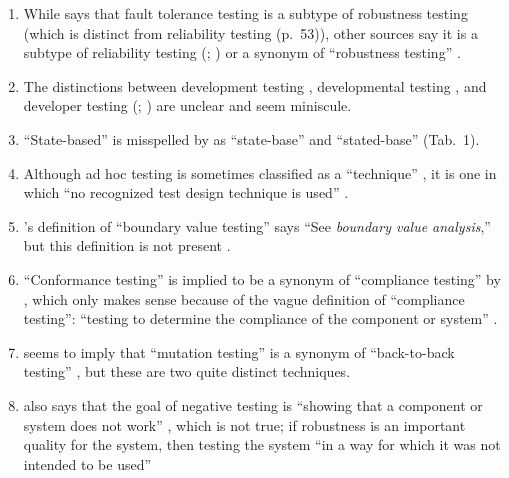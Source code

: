 \begin{enumerate}
      \item While \citeauthor{Firesmith2015} says that fault tolerance testing
            is a subtype of robustness testing
            \citeyearpar[p.~56]{Firesmith2015}
            (which is distinct from reliability testing (p.~53)), other sources
            say it is a subtype of reliability testing (\citealp[p.~375]{IEEE2017};
            \citealp[p.~7-10]{SWEBOK2024}) or a synonym of ``robustness
            testing'' .
      \item The distinctions between development testing \citep[p.~136]{IEEE2017},
            developmental testing \citep[p.~30]{Firesmith2015}, and developer
            testing (\citealp[p.~39]{Firesmith2015}; \citealp[p.~11]{Gerrard2000a})
            are unclear and seem miniscule.
      \item ``State-based'' is misspelled by \citeauthor{Kam2008} as
            ``state-base'' \citeyearpar[pp.~13,~15]{Kam2008} and
            ``stated-base'' (Tab.~1).
      \item Although ad hoc testing is sometimes classified as a ``technique''
            \citep[p.~5-14]{SWEBOK2024}, it is one in which ``no recognized test
            design technique is used'' \citep[p.~42]{Kam2008}.
      \item \citeauthor{Kam2008}'s definition of ``boundary value testing''
            says ``See \emph{boundary value analysis},'' but this definition is
            not present \citeyearpar{Kam2008}.
      \item ``Conformance testing'' is implied to be a synonym of ``compliance
            testing'' by \citeauthor{Kam2008}, which only makes sense because
            of the vague definition of ``compliance testing'': ``testing to
            determine the compliance of the component or system''
            \citeyearpar[p.~43]{Kam2008}.
      \item \citeauthor{Kam2008} seems to imply that ``mutation testing'' is a
            synonym of ``back-to-back testing'' \citeyearpar[p.~46]{Kam2008},
            but these are two quite distinct techniques.
      \item \citeauthor{Kam2008} also says that the goal of negative testing is
            ``showing that a component or system does not work''
            \citeyearpar[p.~46]{Kam2008} , which is not true;
            if robustness is an important quality for the system, then testing
            the system ``in a way for which it was not intended to be used''

\end{enumerate}
